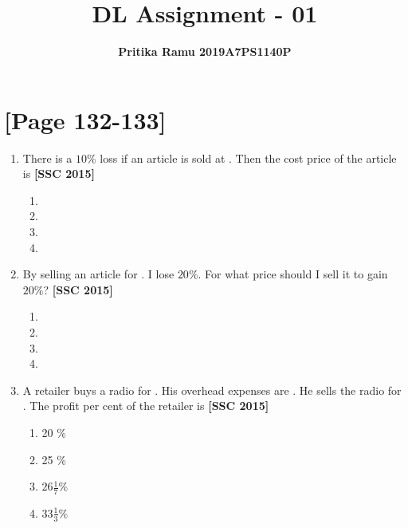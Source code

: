 \documentclass[twocolumn]{article}
\begin{document}
  

\title{DL Assignment - 01}
\author{\bf Pritika Ramu 2019A7PS1140P}

\maketitle

\section{[Page 132-133]}

\begin{enumerate}
        
        \item There is a $10\%$ loss if an article is sold at . Then the cost price of the article is \hfill {\bf[SSC 2015]}
            \begin{enumerate}
                \item {}
                \item {}
                \item {}
                \item {}
            \end{enumerate}
        
        
        \item By selling an article for . I lose $20\%$. For what price should I sell it to gain $20\%$? \hfill {\bf[SSC 2015]}
            \begin{enumerate}
                \item {}
                \item {}
                \item {}
                \item {}
            \end{enumerate}

        
        \item A retailer buys a radio for . His overhead expenses are . He sells the radio for . The profit per cent of the retailer is \hfill {\bf[SSC 2015]}
            \begin{enumerate}
                \item 20 \%
                \item 25 \%
                \item $26 \frac{1}{7} \%$
                \item $33 \frac{1}{3} \%$
            \end{enumerate}
        

\end{enumerate}
\end{document}
